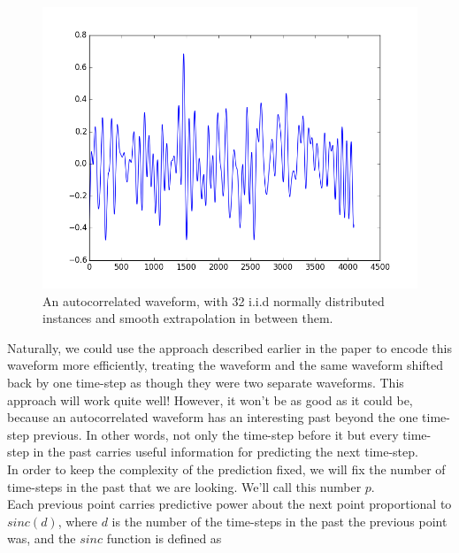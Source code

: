 \documentclass{amsart}
\begin{document}
\begin{figure} 
\begin{center} 
\includegraphics[scale=0.4]{oversampledwaveform.png} 
\caption{An autocorrelated waveform, with 32 i.i.d normally distributed instances and smooth extrapolation in between them.%
}
\end{center}
\end{figure}


Naturally, we could use the approach described earlier in the paper to encode this waveform more efficiently, treating the waveform and the same waveform shifted back by one time-step as though they were two separate waveforms. This approach will work quite well! However, it won't be as good as it could be, because an autocorrelated waveform has an interesting past beyond the one time-step previous. In other words, not only the time-step before it but every time-step in the past carries useful information for predicting the next time-step. \\

In order to keep the complexity of the prediction fixed, we will fix the number of time-steps in the past that we are looking. We'll call this number $p$. \\

Each previous point carries predictive power about the next point proportional to $sinc(d)$, where $d$ is the number of the time-steps in the past the previous point was, and the $sinc$ function is defined as \\
\end{document}
